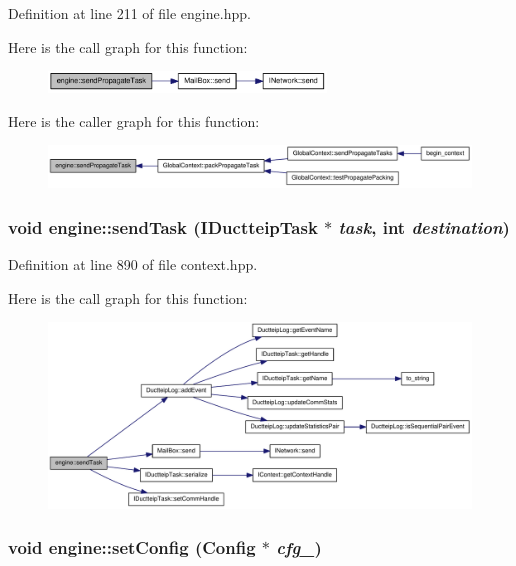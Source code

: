 Definition at line 211 of file engine.hpp.

Here is the call graph for this function:\nopagebreak
\begin{figure}[H]
\begin{center}
\leavevmode
\includegraphics[width=209pt]{classengine_a8cca3e07a3c37e5f7af11da6a81f16c5_cgraph}
\end{center}
\end{figure}


Here is the caller graph for this function:\nopagebreak
\begin{figure}[H]
\begin{center}
\leavevmode
\includegraphics[width=361pt]{classengine_a8cca3e07a3c37e5f7af11da6a81f16c5_icgraph}
\end{center}
\end{figure}
\hypertarget{classengine_a6db82799db55ccddd3d79093eeb3a16b}{
\subsubsection[{sendTask}]{\setlength{\rightskip}{0pt plus 5cm}void engine::sendTask ({\bf IDuctteipTask} $\ast$ {\em task}, \/  int {\em destination})}}
\label{classengine_a6db82799db55ccddd3d79093eeb3a16b}


Definition at line 890 of file context.hpp.

Here is the call graph for this function:\nopagebreak
\begin{figure}[H]
\begin{center}
\leavevmode
\includegraphics[width=370pt]{classengine_a6db82799db55ccddd3d79093eeb3a16b_cgraph}
\end{center}
\end{figure}
\hypertarget{classengine_ab44d977af665ec74444db0b781d765c7}{
\subsubsection[{setConfig}]{\setlength{\rightskip}{0pt plus 5cm}void engine::setConfig ({\bf Config} $\ast$ {\em cfg\_\-})}}
\label{classengine_ab44d977af665ec74444db0b781d765c7}


